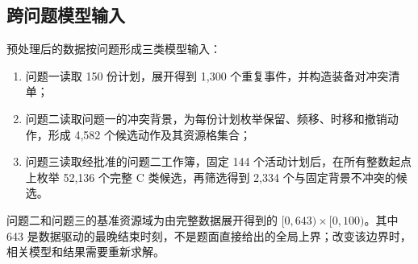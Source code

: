 \subsection{跨问题模型输入}
预处理后的数据按问题形成三类模型输入：
\begin{enumerate}[label=(P\arabic*)]
  \item 问题一读取 150 份计划，展开得到 1,300 个重复事件，并构造装备对冲突清单；
  \item 问题二读取问题一的冲突背景，为每份计划枚举保留、频移、时移和撤销动作，形成 4,582 个候选动作及其资源格集合；
  \item 问题三读取经批准的问题二工作簿，固定 144 个活动计划后，在所有整数起点上枚举 52,136 个完整 C 类候选，再筛选得到 2,334 个与固定背景不冲突的候选。
\end{enumerate}

问题二和问题三的基准资源域为由完整数据展开得到的 \([0,643)\times[0,100)\)。其中 643 是数据驱动的最晚结束时刻，不是题面直接给出的全局上界；改变该边界时，相关模型和结果需要重新求解。
